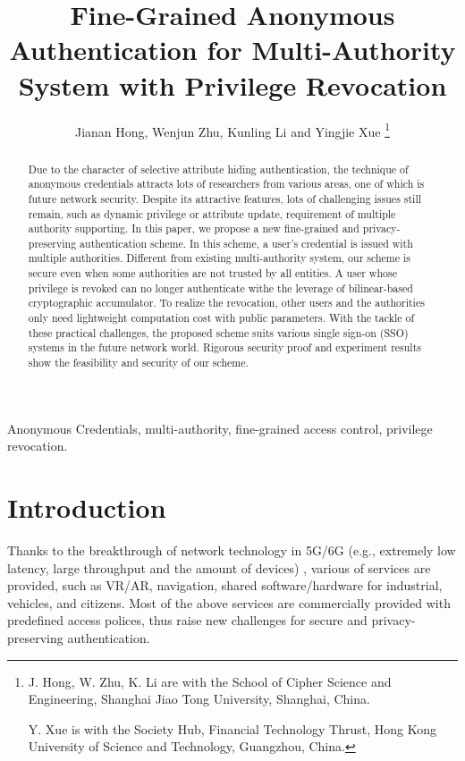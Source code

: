 \documentclass[journal]{IEEEtran}
\title{Fine-Grained Anonymous Authentication for Multi-Authority System with Privilege Revocation}
\author{Jianan Hong, Wenjun Zhu, Kunling Li and Yingjie Xue
\thanks{J. Hong, W. Zhu, K. Li are with the School of Cipher Science and Engineering, Shanghai Jiao Tong University, Shanghai, China.

Y. Xue is with the Society Hub, Financial Technology Thrust, Hong Kong University of Science and Technology, Guangzhou, China.
}
}
\begin{document}
	\maketitle
	
	\begin{abstract}
		Due to the character of selective attribute hiding authentication, the technique of anonymous credentials attracts lots of researchers from various areas, one of which is future network security. Despite its attractive features, lots of challenging issues still remain, such as dynamic privilege or attribute update, requirement of multiple authority supporting. 
		In this paper, we propose a new fine-grained and privacy-preserving authentication scheme. In this scheme, a user's credential is issued with multiple authorities. Different from existing multi-authority system, our scheme is secure even when some authorities are not trusted by all entities. A user whose privilege is revoked can no longer authenticate withe the leverage of bilinear-based cryptographic accumulator. To realize the revocation, other users and the authorities only need lightweight computation cost with public parameters. With the tackle of these practical challenges, the proposed scheme suits various single sign-on (SSO) systems in the future network world. Rigorous security proof and experiment results show the feasibility and security of our scheme.
	\end{abstract}
\begin{IEEEkeywords}
	Anonymous Credentials, multi-authority, fine-grained access control, privilege revocation.
\end{IEEEkeywords}


\section{Introduction}
Thanks to the breakthrough of network technology in 5G/6G (e.g., extremely low latency, large throughput and the amount of devices) \cite{siriwardhana2021survey, jiang2021road}, various of services are provided, such as VR/AR, navigation, shared software/hardware for industrial, vehicles, and citizens. Most of the above services are commercially provided with predefined access polices, thus raise new challenges for secure and privacy-preserving authentication. 
\end{document}
